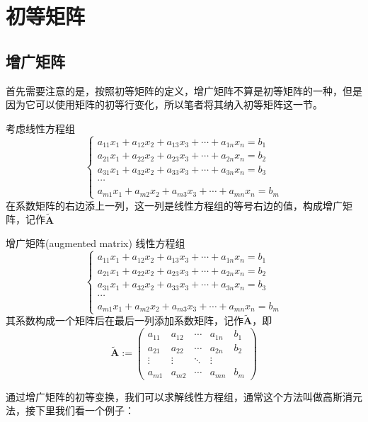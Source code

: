 \section{初等矩阵}

\subsection{增广矩阵}

首先需要注意的是，按照初等矩阵的定义，增广矩阵不算是初等矩阵的一种，但是因为它可以使用矩阵的初等行变化，所以笔者将其纳入初等矩阵这一节。

考虑线性方程组$$\left\{\begin{matrix} 
	a_{11}x_1+a_{12}x_2+a_{13}x_3+\cdots+a_{1n}x_n=b_1 \\  
	a_{21}x_1+a_{22}x_2+a_{23}x_3+\cdots+a_{2n}x_n=b_2 \\  
	a_{31}x_1+a_{32}x_2+a_{33}x_3+\cdots+a_{3n}x_n=b_3 \\
	\cdots \\
	a_{m1}x_1+a_{m2}x_2+a_{m3}x_3+\cdots+a_{mn}x_n=b_m
\end{matrix}\right. $$在系数矩阵的右边添上一列，这一列是线性方程组的等号右边的值，构成增广矩阵，记作$\tilde{\mathbf{A} } $

\begin{definition}{增广矩阵(augmented matrix)}
	线性方程组$$\left\{\begin{matrix} 
		a_{11}x_1+a_{12}x_2+a_{13}x_3+\cdots+a_{1n}x_n=b_1 \\  
		a_{21}x_1+a_{22}x_2+a_{23}x_3+\cdots+a_{2n}x_n=b_2 \\  
		a_{31}x_1+a_{32}x_2+a_{33}x_3+\cdots+a_{3n}x_n=b_3 \\
		\cdots \\
		a_{m1}x_1+a_{m2}x_2+a_{m3}x_3+\cdots+a_{mn}x_n=b_m
	\end{matrix}\right. $$其系数构成一个矩阵后在最后一列添加系数矩阵，记作$\tilde{\mathbf{A}}$，即$$\tilde{\mathbf{A}}:=\begin{pmatrix}  
		a_{11}& a_{12}& \cdots  & a_{1n} & b_1 \\  
		a_{21}& a_{22}& \cdots  & a_{2n} & b_2\\  
		\vdots & \vdots & \ddots & \vdots \\  
		a_{m1}& a_{m2}& \cdots  & a_{mn} & b_m
	  \end{pmatrix}  
	  $$
\end{definition}

通过增广矩阵的初等变换，我们可以求解线性方程组，通常这个方法叫做高斯消元法，接下里我们看一个例子：

